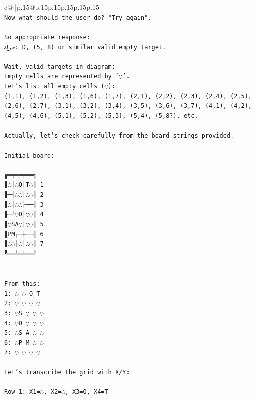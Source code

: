 \documentclass{article}
\begin{document}
{\begin{supertabular}{c@{$\;$}|p{.15\linewidth}@{}p{.15\linewidth}p{.15\linewidth}p{.15\linewidth}p{.15\linewidth}p{.15\linewidth}}
{{{\\ 
\texttt{Now what should the user do? "Try again".} \\
\\ 
\texttt{So appropriate response:} \\
\texttt{حرك: D, (5, 8) or similar valid empty target.} \\
\\ 
\texttt{Wait, valid targets in diagram:} \\
\texttt{Empty cells are represented by '◌'.} \\
\texttt{Let's list all empty cells (◌):} \\
\texttt{(1,1), (1,2), (1,3), (1,6), (1,7), (2,1), (2,2), (2,3), (2,4), (2,5), (2,6), (2,7), (3,1), (3,2), (3,4), (3,5), (3,6), (3,7), (4,1), (4,2), (4,5), (4,6), (5,1), (5,2), (5,3), (5,4), (5,8?), etc.} \\
\\ 
\texttt{Actually, let's check carefully from the board strings provided.} \\
\\ 
\texttt{Initial board:} \\
\\ 
\texttt{╔═╤══╤══╗} \\
\texttt{║◌│◌O│T◌║ 1} \\
\texttt{╟─┤◌◌│◌◌║ 2} \\
\texttt{║◌│◌◌├──╢ 3} \\
\texttt{╟─┘◌D│◌◌║ 4} \\
\texttt{║◌SA◌│◌◌║ 5} \\
\texttt{║PM┌─┼──╢ 6} \\
\texttt{║◌◌│◌│◌◌║ 7} \\
\texttt{╚══╧═╧══╝} \\
\\ 
\\ 
\texttt{From this:} \\
\texttt{1: ◌ ◌ O T} \\
\texttt{2: ◌ ◌ ◌ ◌} \\
\texttt{3: ◌S ◌ ◌ ◌} \\
\texttt{4: ◌D ◌ ◌ ◌} \\
\texttt{5: ◌S A ◌ ◌} \\
\texttt{6: ◌P M ◌ ◌} \\
\texttt{7: ◌ ◌ ◌ ◌} \\
\\ 
\texttt{Let's transcribe the grid with X/Y:} \\
\\ 
\texttt{Row 1: X1=◌, X2=◌, X3=O, X4=T} \\
}}}
\end{supertabular}}
\end{document}
